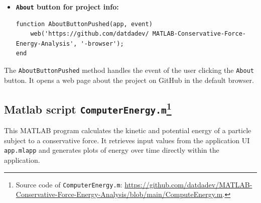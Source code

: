 \documentclass[13pt,a4paper]{report}
\begin{document}
\begin{itemize}[leftmargin=*,itemindent=0.1cm]
\begin{verbatim}
|\setcounter{FancyVerbLine}{75}|function PECheckBoxValueChanged(app, event)
    if ~app.PECheckBox.Value && ~app.KECheckBox.Value
        app.PECheckBox.Value = true;
        errordlg('At least one of the two checkboxes should be activated!', 'Warning', 'modal');
    elseif length(app.UIAxes.Children) == 2
        if app.PECheckBox.Value
            set(app.UIAxes.Children(1), 'Visible', 'on');
        else
            set(app.UIAxes.Children(1), 'Visible', 'off');
        end
    end
end
    \end{verbatim}
The callback functions \texttt{KECheckBoxValueChanged} and \texttt{PECheckBoxValueChanged} are associated with the \texttt{kinetic energy checkbox} and \texttt{potential energy checkbox}, respectively. These functions check whether at least one of the checkboxes is activated. If neither checkbox is activated, the function activates one of them and displays a warning message. Otherwise, the function adjusts the visibility of the plot based on the checkbox value.

    \newpage
    \item \textbf{\texttt{About} button for project info:}
    \begin{verbatim}
function AboutButtonPushed(app, event)
    web('https://github.com/datdadev/ MATLAB-Conservative-Force-Energy-Analysis', '-browser');
end
    \end{verbatim}
\end{itemize}
The \texttt{AboutButtonPushed} method handles the event of the user clicking the \texttt{About} button. It opens a web page about the project on GitHub in the default browser.

\subsection[Matlab script \texttt{ComputerEnergy.m}]{Matlab script \texttt{ComputerEnergy.m}\protect\footnote[1]{Source code of \texttt{ComputerEnergy.m}: \url{https://github.com/datdadev/MATLAB-Conservative-Force-Energy-Analysis/blob/main/ComputeEnergy.m}.}}

This MATLAB program calculates the kinetic and potential energy of a particle subject to a conservative force. It retrieves input values from the application UI \texttt{app.mlapp} and generates plots of energy over time directly within the application.
\end{document}
